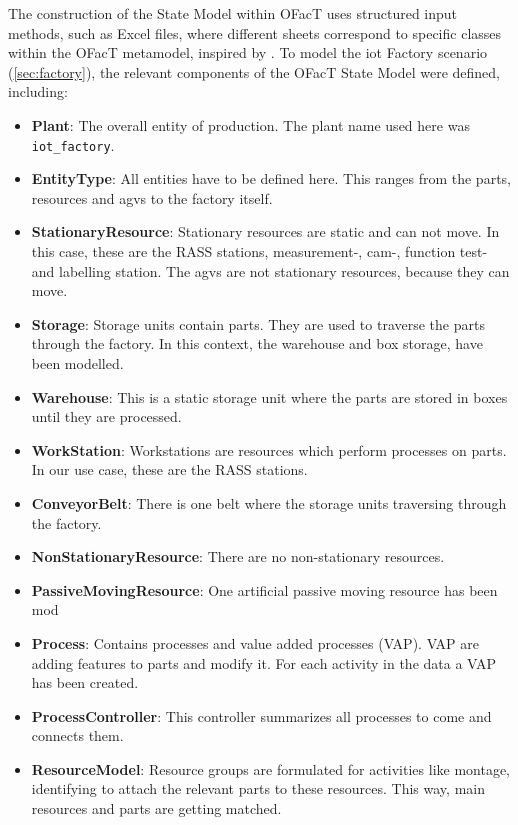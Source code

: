 The construction of the State Model within OFacT uses structured input methods, such as Excel files, where different sheets correspond to specific classes within the OFacT metamodel, inspired by \textcite{Schwede2024}. To model the \gls{iot} Factory scenario (\autoref{sec:factory}), the relevant components of the OFacT State Model were defined, including:

\begin{itemize}
    \item \textbf{Plant}: The overall entity of production. The plant name used here was \texttt{iot\_factory}.
    \item \textbf{EntityType}: All entities have to be defined here. This ranges from the parts, resources and \gls{agv}s to the factory itself.
    \item \textbf{StationaryResource}: Stationary resources are static and can not move. In this case, these are the RASS stations, measurement-, cam-, function test- and labelling station. The \gls{agv}s are not stationary resources, because they can move.
    \item \textbf{Storage}: Storage units contain parts. They are used to traverse the parts through the factory. In this context, the warehouse and box storage, have been modelled.
    \item \textbf{Warehouse}: This is a static storage unit where the parts are stored in boxes until they are processed.
    \item \textbf{WorkStation}: Workstations are resources which perform processes on parts. In our use case, these are the RASS stations.
    \item \textbf{ConveyorBelt}: There is one belt where the storage units traversing through the factory.
    \item \textbf{NonStationaryResource}: There are no non-stationary resources.
    \item \textbf{PassiveMovingResource}: One artificial passive moving resource has been mod
    \item \textbf{Process}: Contains processes and value added processes (VAP). VAP are adding features to parts and modify it. For each activity in the data a VAP has been created.
    \item \textbf{ProcessController}: This controller summarizes all processes to come and connects them.
    \item \textbf{ResourceModel}: Resource groups are formulated for activities like montage, identifying to attach the relevant parts to these resources. This way, main resources and parts are getting matched.

\end{itemize}
